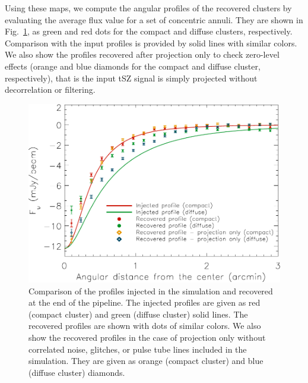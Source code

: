 Using these maps, we compute the angular profiles of the recovered clusters by evaluating the average flux value for a set of concentric annuli. They are shown in Fig.~\ref{fig:rxj_simu_prof}, as green and red dots for the compact and diffuse clusters, respectively. Comparison with the input profiles is provided by solid lines with similar colors. We also show the profiles recovered after projection only  to check zero-level effects (orange and blue diamonds for the compact and diffuse cluster, respectively), that is the input tSZ signal is simply projected without decorrelation or filtering.
	\begin{figure}
	\centering
	\includegraphics[width=\columnwidth]{Figure/pipeline_transfer}
	\caption{Comparison of the profiles injected in the simulation and recovered at the end of the pipeline. The injected profiles are given as red (compact cluster) and green (diffuse cluster) solid lines. The recovered profiles are shown with dots of similar colors. We also show the recovered profiles in the case of projection only without correlated noise, glitches, or pulse tube lines included in the simulation. They are given as orange (compact cluster) and blue (diffuse cluster) diamonds.}
        \label{fig:rxj_simu_prof}
	\end{figure}
	
